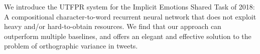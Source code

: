 We introduce the UTFPR system for the Implicit Emotions Shared Task of 2018: A compositional character-to-word recurrent neural network that does not exploit heavy and/or hard-to-obtain resources. We find that our approach can outperform multiple baselines, and offers an elegant and effective solution to the problem of orthographic variance in tweets.
